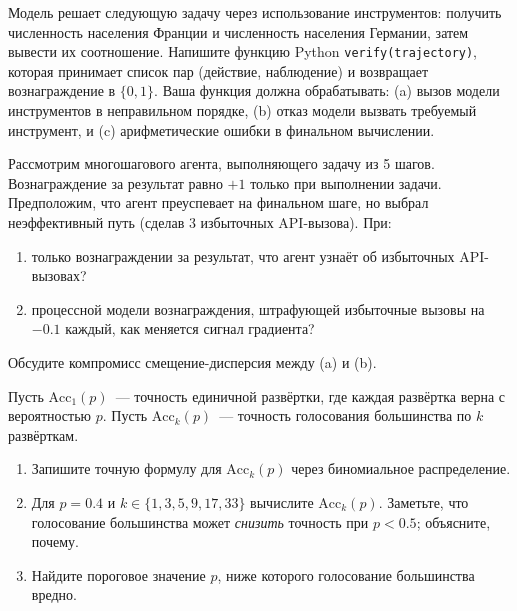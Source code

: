\begin{exercise}
\label{ex:tool-calling-reward}
Модель решает следующую задачу через использование инструментов: получить
численность населения Франции и численность населения Германии, затем вывести их
соотношение. Напишите функцию Python \texttt{verify(trajectory)}, которая принимает
список пар (действие, наблюдение) и возвращает вознаграждение в
$\{0, 1\}$. Ваша функция должна обрабатывать: (a) вызов модели инструментов
в неправильном порядке, (b) отказ модели вызвать требуемый инструмент,
и (c) арифметические ошибки в финальном вычислении.
\end{exercise}

\begin{exercise}
\label{ex:process-vs-outcome}
Рассмотрим многошагового агента, выполняющего задачу из 5 шагов. Вознаграждение за результат
равно $+1$ только при выполнении задачи. Предположим, что агент преуспевает на
финальном шаге, но выбрал неэффективный путь (сделав 3 избыточных API-вызова).
При:
\begin{enumerate}[label=(\alph*)]
\item только вознаграждении за результат, что агент узнаёт об
  избыточных API-вызовах?
\item процессной модели вознаграждения, штрафующей избыточные вызовы на $-0.1$
  каждый, как меняется сигнал градиента?
\end{enumerate}
Обсудите компромисс смещение-дисперсия между (a) и (b).
\end{exercise}

\begin{exercise}
\label{ex:inference-scaling}
Пусть $\text{Acc}_1(p)$~--- точность единичной развёртки, где
каждая развёртка верна с вероятностью $p$. Пусть $\text{Acc}_k(p)$~---
точность голосования большинства по $k$ развёрткам.
\begin{enumerate}[label=(\alph*)]
\item Запишите точную формулу для $\text{Acc}_k(p)$ через
  биномиальное распределение.
\item Для $p = 0.4$ и $k \in \{1, 3, 5, 9, 17, 33\}$ вычислите
  $\text{Acc}_k(p)$. Заметьте, что голосование большинства может \emph{снизить}
  точность при $p < 0.5$; объясните, почему.
\item Найдите пороговое значение $p$, ниже которого голосование большинства вредно.
\end{enumerate}
\end{exercise}

